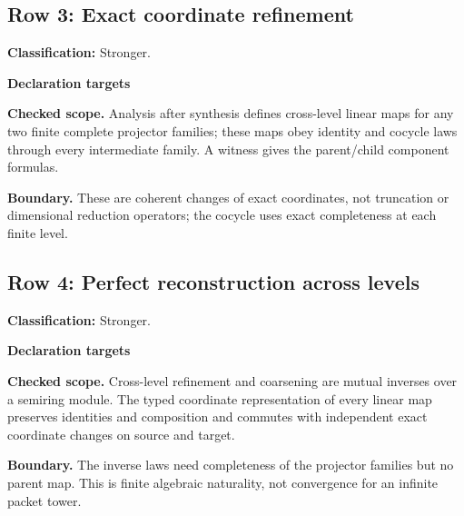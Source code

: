 \subsection{Row 3: Exact coordinate refinement}
\label{row:3}
\textbf{Classification:} Stronger.
\par\smallskip\textbf{Declaration targets}\par
{\small\noindent{}\par}
{\small\noindent{}\par}
{\small\noindent{}\par}
{\small\noindent{}\par}
{\small\noindent{}\par}
{\small\noindent{}\par}
{\small\noindent{}\par}
\smallskip\textbf{Checked scope.} Analysis after synthesis defines cross-level linear maps for any two finite complete projector families; these maps obey identity and cocycle laws through every intermediate family. A  witness gives the parent/child component formulas.
\par\smallskip\textbf{Boundary.} These are coherent changes of exact coordinates, not truncation or dimensional reduction operators; the cocycle uses exact completeness at each finite level.
\medskip
{}
\subsection{Row 4: Perfect reconstruction across levels}
\label{row:4}
\textbf{Classification:} Stronger.
\par\smallskip\textbf{Declaration targets}\par
{\small\noindent{}\par}
{\small\noindent{}\par}
{\small\noindent{}\par}
{\small\noindent{}\par}
{\small\noindent{}\par}
{\small\noindent{}\par}
\smallskip\textbf{Checked scope.} Cross-level refinement and coarsening are mutual inverses over a semiring module. The typed coordinate representation of every linear map preserves identities and composition and commutes with independent exact coordinate changes on source and target.
\par\smallskip\textbf{Boundary.} The inverse laws need completeness of the projector families but no parent map. This is finite algebraic naturality, not convergence for an infinite packet tower.
\medskip
{}
